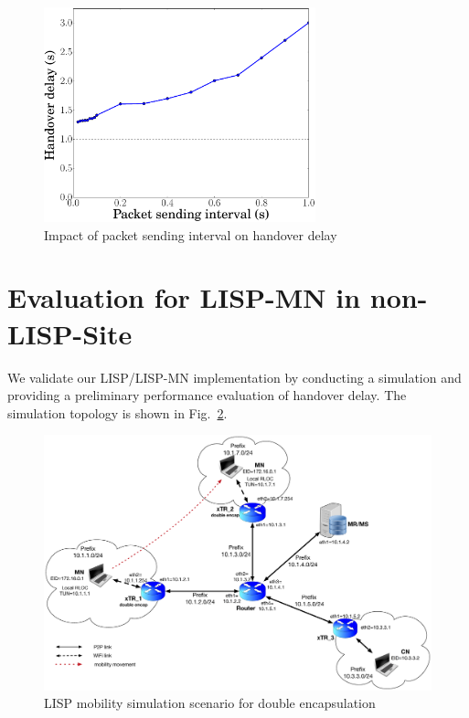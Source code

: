 \begin{figure}[!th]
	\centering
	\includegraphics[width=0.7\textwidth]{Pics/LISP_mobility_double_encap_PacketInterval}
	\caption{Impact of packet sending interval on handover delay}
	\label{LISP_mobility_double_encap_PacketInterval}
\end{figure}


\section{Evaluation for LISP-MN in non-LISP-Site}
\label{sec:ns3_evaluation_lispmn}
We validate our LISP/LISP-MN implementation by conducting a simulation and providing a preliminary performance evaluation of handover delay. The simulation topology is shown in Fig.~\ref{sim_scenario}.
\begin{figure}[!th]
	\centering
	\includegraphics[width=\textwidth]{Pics/mobility_through_subnets_2_encap_topo}
	\caption{LISP mobility simulation scenario for double encapsulation}
	\label{sim_scenario}
\end{figure}

